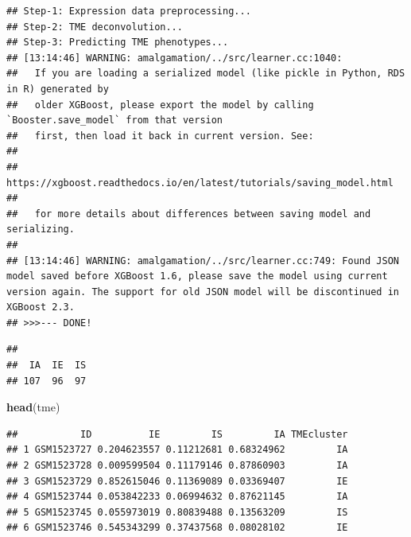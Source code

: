 \documentclass[
  12pt,
]{book}
\newenvironment{Shaded}{\begin{snugshade}}{\end{snugshade}}
\newcommand{\FunctionTok}[1]{\textcolor[rgb]{0.13,0.29,0.53}{\textbf{#1}}}
\newcommand{\NormalTok}[1]{#1}
\newcommand{\SpecialCharTok}[1]{\textcolor[rgb]{0.81,0.36,0.00}{\textbf{#1}}}
\begin{document}
\begin{verbatim}
## Step-1: Expression data preprocessing...
## Step-2: TME deconvolution...
## Step-3: Predicting TME phenotypes...
## [13:14:46] WARNING: amalgamation/../src/learner.cc:1040: 
##   If you are loading a serialized model (like pickle in Python, RDS in R) generated by
##   older XGBoost, please export the model by calling `Booster.save_model` from that version
##   first, then load it back in current version. See:
## 
##     https://xgboost.readthedocs.io/en/latest/tutorials/saving_model.html
## 
##   for more details about differences between saving model and serializing.
## 
## [13:14:46] WARNING: amalgamation/../src/learner.cc:749: Found JSON model saved before XGBoost 1.6, please save the model using current version again. The support for old JSON model will be discontinued in XGBoost 2.3.
## >>>--- DONE!
\end{verbatim}

\begin{Shaded}
\end{Shaded}

\begin{verbatim}
## 
##  IA  IE  IS 
## 107  96  97
\end{verbatim}

\begin{Shaded}
\begin{Highlighting}[]
\FunctionTok{head}\NormalTok{(tme)}
\end{Highlighting}
\end{Shaded}

\begin{verbatim}
##           ID          IE         IS         IA TMEcluster
## 1 GSM1523727 0.204623557 0.11212681 0.68324962         IA
## 2 GSM1523728 0.009599504 0.11179146 0.87860903         IA
## 3 GSM1523729 0.852615046 0.11369089 0.03369407         IE
## 4 GSM1523744 0.053842233 0.06994632 0.87621145         IA
## 5 GSM1523745 0.055973019 0.80839488 0.13563209         IS
## 6 GSM1523746 0.545343299 0.37437568 0.08028102         IE
\end{verbatim}

\begin{Shaded}
\end{Shaded}
\end{document}
